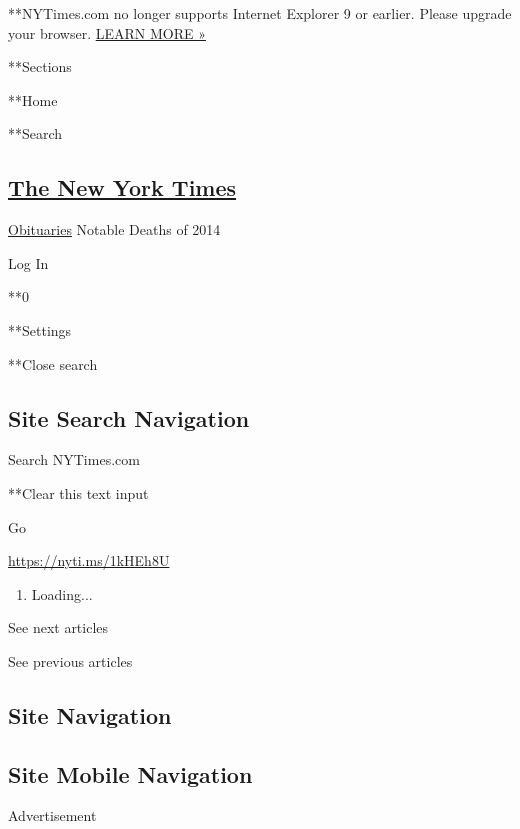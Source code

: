 **NYTimes.com no longer supports Internet Explorer 9 or earlier. Please
upgrade your browser.
\href{http://www.nytimes.com/content/help/site/ie9-support.html}{LEARN
MORE »}

**Sections

**Home

**Search

\hypertarget{the-new-york-times}{%
\subsection{\texorpdfstring{\href{http://www.nytimes.com/}{The New York
Times}}{The New York Times}}\label{the-new-york-times}}

 \href{https://www.nytimes.com/section/obituaries}{Obituaries}
\textbar{}Notable Deaths of 2014

Log In

**0

**Settings

**Close search

\hypertarget{site-search-navigation}{%
\subsection{Site Search Navigation}\label{site-search-navigation}}

Search NYTimes.com

**Clear this text input

Go

\url{https://nyti.ms/1kHEh8U}

\begin{enumerate}
\def\labelenumi{\arabic{enumi}.}
\item
  Loading...
\end{enumerate}

See next articles

See previous articles

\hypertarget{site-navigation}{%
\subsection{Site Navigation}\label{site-navigation}}

\hypertarget{site-mobile-navigation}{%
\subsection{Site Mobile Navigation}\label{site-mobile-navigation}}

Advertisement

